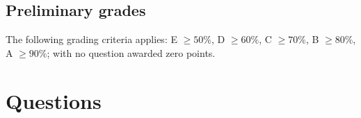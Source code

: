 \documentclass[a4paper,addpoints]{miunexam}
\begin{document}
\subsection*{Preliminary grades}
The following grading criteria applies:
E \(\geq 50\%\),
D \(\geq 60\%\),
C \(\geq 70\%\),
B \(\geq 80\%\),
A \(\geq 90\%\);
with no question awarded zero points.


\clearpage
\section*{Questions}
\label{sec:Questions}
\end{document}
